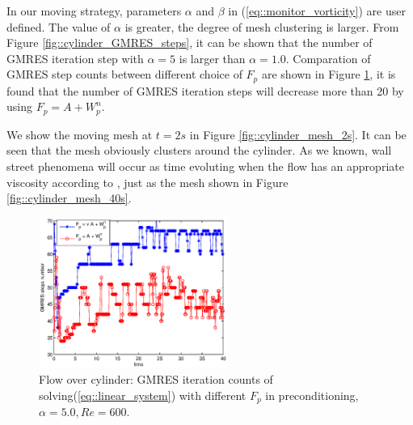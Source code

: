 \documentclass{eajam}
\begin{document}
      In our moving strategy, parameters $\alpha$ and
      $\beta$ in (\ref{eq::monitor_vorticity}) are user defined. The
      value of $\alpha$ is greater, the degree of mesh clustering is
      larger. From Figure \ref{fig::cylinder_GMRES_steps}, it can be
      shown that the number of GMRES iteration step with $\alpha = 5$
      is larger than $\alpha = 1.0$. Comparation of GMRES step counts
      between different choice of $F_p$ are shown in Figure 
      \ref{fig::cylinder_GMRES_steps_comparation}, it is found that
      the number of GMRES iteration steps will decrease more than 20 by  
      using $F_p = A + W_p^n$.

      We show the moving mesh at $t = 2s$ in Figure
      \ref{fig::cylinder_mesh_2s}. It can be seen that the mesh obviously
      clusters around the cylinder. As we known, wall street phenomena
      will occur as time evoluting when the flow has an appropriate
      viscosity according to \cite{milton1982album}, just as the mesh
      shown in Figure \ref{fig::cylinder_mesh_40s}.
      
      \begin{figure}[!htbp]
        \begin{center}
          \includegraphics[width = 0.55\textwidth]{picture/obstacle_flow_data/comparation_NS_iterate_step.eps}
        \end{center}
        \caption{\small Flow over cylinder: GMRES iteration counts of
                 solving(\ref{eq::linear_system}) with different $F_p$ in
                 preconditioning, $\alpha = 5.0, Re = 600$.}
        \label{fig::cylinder_GMRES_steps_comparation}
      \end{figure}
      
\end{document}
